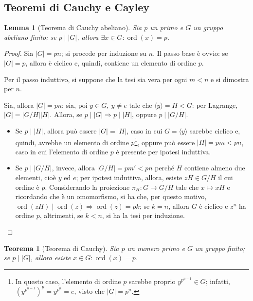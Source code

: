 \documentclass[11pt]{article}
\theoremstyle{style}
\newtheorem{teorema}{Teorema}[section]
\newtheorem{lemma}{Lemma}[teorema]
\numberwithin{equation}{subsection}
\begin{document}
\subsection{Teoremi di Cauchy e Cayley}
\begin{lemma}[Teorema di Cauchy abeliano]\label{cab}
	Sia $p$ un primo e $G$ un gruppo abeliano finito; se $p  \mid  |G|$, allora $\exists x \in G : \operatorname{ord}(x) =p$.
\end{lemma}
	\begin{proof}
		Sia $\lvert G \rvert = pn$; si procede per induzione su $n$.
		Il passo base \`e ovvio: se $\lvert G \rvert =p$, allora \`e ciclico e, quindi, contiene un elemento di ordine $p$.

		Per il passo induttivo, si suppone che la tesi sia vera per ogni $m < n$ e si dimostra per $n$.

		Sia, allora $\lvert G \rvert  = pn$; sia, poi $y \in G, \ y\neq e$ tale che $\langle y \rangle= H < G$: per Lagrange, $\lvert G \rvert  = \lvert G / H \rvert  \lvert H \rvert $.
		Allora, se $p  \mid \lvert G \rvert \Rightarrow  p  \mid \lvert H \rvert $, oppure $ p   \mid \lvert G / H \rvert $.
		\begin{itemize}
			\item Se $p  \mid \lvert H \rvert $, allora pu\`o essere $\lvert G \rvert  = \lvert H \rvert $, caso in cui $G = \langle y \rangle$ sarebbe ciclico e, quindi, avrebbe un elemento di ordine $p$\footnote{In questo caso, l'elemento di ordine $p$ sarebbe proprio $y^{p^{n-1} } \in G $; infatti, $(y^{p^{n-1} } )^p = y^{p^n} = e$, visto che $|G| = p^n$.}, oppure pu\`o essere $\lvert H \rvert  = pm < pn$, caso in cui l'elemento di ordine $p$ \`e presente per ipotesi induttiva.
			\item Se $p  \mid  \lvert G / H \rvert $, invece, allora $\lvert G / H \rvert = pm' < pn$ perch\'e $H$ contiene almeno due elementi, cio\`e $y$ ed $e$; per ipotesi induttiva, allora, esiste $zH \in G / H$ il cui ordine \`e $p$.
				Considerando la proiezione $\pi_H : G \to G / H$ tale che $x \mapsto xH$ e ricordando che \`e un omomorfismo, si ha che, per questo motivo, $\operatorname{ord}(zH)  \mid \operatorname{ord}(z)\Rightarrow \operatorname{ord}(z) = pk$; se $k = n$, allora $G$ \`e ciclico e $z^n$ ha ordine $p$, altrimenti, se $k<n$, si ha la tesi per induzione.
		\end{itemize}
	\end{proof}
\begin{teorema}
	[Teorema di Cauchy]
	Sia $p$ un numero primo e $G$ un gruppo finito; se $p  \mid |G|$, allora esiste $x \in G : \operatorname{ord}(x) = p $.
\end{teorema}
\end{document}
